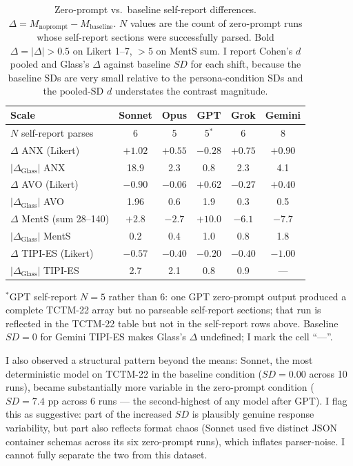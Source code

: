 \documentclass[11pt,a4paper]{article}
\begin{document}
\begin{table}[htbp]\centering\footnotesize
\caption{Zero-prompt vs.\ baseline self-report differences. $\Delta = M_{\text{noprompt}} - M_{\text{baseline}}$. $N$ values are the count of zero-prompt runs whose self-report sections were successfully parsed. Bold $\Delta = |\Delta| > 0.5$ on Likert 1--7, $> 5$ on MentS sum. I report Cohen's $d$ pooled and Glass's $\Delta$ against baseline $SD$ for each shift, because the baseline SDs are very small relative to the persona-condition SDs and the pooled-SD $d$ understates the contrast magnitude.}
\label{tab:noprompt-shifts}
\begin{tabular}{lccccc}
\toprule
\textbf{Scale} & \textbf{Sonnet} & \textbf{Opus} & \textbf{GPT} & \textbf{Grok} & \textbf{Gemini} \\
\midrule
$N$ self-report parses & 6 & 5 & 5$^{*}$ & 6 & 8 \\
\midrule
$\Delta$ ANX (Likert) & $\mathbf{+1.02}$ & $\mathbf{+0.55}$ & $-0.28$ & $\mathbf{+0.75}$ & $\mathbf{+0.90}$ \\
$|\Delta_{\text{Glass}}|$ ANX & 18.9 & 2.3 & 0.8 & 2.3 & 4.1 \\
\midrule
$\Delta$ AVO (Likert) & $\mathbf{-0.90}$ & $-0.06$ & $\mathbf{+0.62}$ & $-0.27$ & $+0.40$ \\
$|\Delta_{\text{Glass}}|$ AVO & 1.96 & 0.6 & 1.9 & 0.3 & 0.5 \\
\midrule
$\Delta$ MentS (sum 28--140) & $+2.8$ & $-2.7$ & $\mathbf{+10.0}$ & $\mathbf{-6.1}$ & $\mathbf{-7.7}$ \\
$|\Delta_{\text{Glass}}|$ MentS & 0.2 & 0.4 & 1.0 & 0.8 & 1.8 \\
\midrule
$\Delta$ TIPI-ES (Likert) & $\mathbf{-0.57}$ & $-0.40$ & $-0.20$ & $-0.40$ & $\mathbf{-1.00}$ \\
$|\Delta_{\text{Glass}}|$ TIPI-ES & 2.7 & 2.1 & 0.8 & 0.9 & --- \\
\bottomrule
\end{tabular}
\begin{flushleft}
\footnotesize $^{*}$GPT self-report $N = 5$ rather than 6: one GPT zero-prompt output produced a complete TCTM-22 array but no parseable self-report sections; that run is reflected in the TCTM-22 table but not in the self-report rows above. Baseline $SD = 0$ for Gemini TIPI-ES makes Glass's $\Delta$ undefined; I mark the cell ``---''.
\end{flushleft}
\end{table}

I also observed a structural pattern beyond the means: Sonnet, the most deterministic model on TCTM-22 in the baseline condition ($SD = 0.00$ across 10 runs), became substantially more variable in the zero-prompt condition ($SD = 7.4$ pp across 6 runs --- the second-highest of any model after GPT). I flag this as suggestive: part of the increased $SD$ is plausibly genuine response variability, but part also reflects format chaos (Sonnet used five distinct JSON container schemas across its six zero-prompt runs), which inflates parser-noise. I cannot fully separate the two from this dataset.
\end{document}
